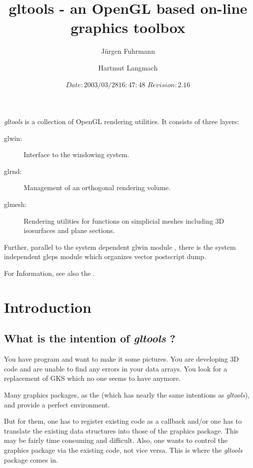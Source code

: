\documentclass[a4paper]{article}
\title{gltools - an OpenGL based on-line graphics toolbox}
\author{J\"urgen Fuhrmann \and Hartmut Langmach}
\date{$Date: 2003/03/28 16:47:48 $ $Revision: 2.16 $}
\begin{document}
\maketitle

{\em gltools}  is a collection of OpenGL rendering utilities.
It consists of three layers:
\begin{description}
\item[glwin:] Interface to the windowing system.
\item[glrnd:] Management of an orthogonal  rendering volume.
\item[glmesh:] Rendering utilities for functions on simplicial meshes
  including 3D isosurfaces and plane sections.
\end{description}
Further, parallel to the system dependent glwin module , 
there is the system independent gleps module
which organizes vector postscript dump.

For Information, see also the 
.


\section{Introduction}
\subsection{What is the intention of  {\em gltools} ?}


You have program and want to make it some pictures. You are developing
3D code and are unable to find any errors in your data arrays. You
look for a replacement of GKS which no one seems to have anymore.

Many      graphics        packages,      as       the       
(which    has nearly      the  same     intentions    as {\em    gltools}),
and   
provide a perfect environment.

But for them, one has  to register existing code  as a callback and/or
one has  to translate the existing  data structures  into those of the
graphics package.  This may  be  fairly time consuming and  difficult.
Also, one wants to control the graphics package via the existing code,
not vice versa.  This is where the {\em gltools} package comes in. 
\end{document}
